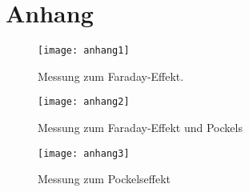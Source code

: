 \newpage
\section{Anhang}
\begin{figure}[h]
\texttt{[image: anhang1]}
\caption{Messung zum Faraday-Effekt.}
\label{fig:anhang1}
\end{figure}
\clearpage
\begin{figure}[h]
\begin{center}
\texttt{[image: anhang2]}
\caption{Messung zum Faraday-Effekt und Pockels}
\label{fig:anhang2}
\end{center}
\end{figure}
\clearpage
\begin{figure}[t]
\begin{center}
\texttt{[image: anhang3]}
\caption{Messung zum Pockelseffekt}
\label{fig:anhang3}
\end{center}
\end{figure}